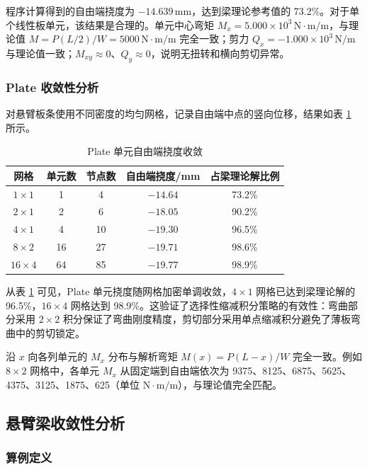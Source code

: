 \documentclass[UTF8,a4paper,zihao=-4]{ctexart}
\begin{document}
程序计算得到的自由端挠度为 $-14.639\,\mathrm{mm}$，达到梁理论参考值的 73.2\%。对于单个线性板单元，该结果是合理的。单元中心弯矩 $M_x=5.000\times10^3\,\mathrm{N\cdot m/m}$，与理论值 $M=P(L/2)/W=5000\,\mathrm{N\cdot m/m}$ 完全一致；剪力 $Q_x=-1.000\times10^3\,\mathrm{N/m}$ 与理论值一致；$M_{xy}\approx0$、$Q_y\approx0$，说明无扭转和横向剪切异常。

\subsubsection{Plate 收敛性分析}

对悬臂板条使用不同密度的均匀网格，记录自由端中点的竖向位移，结果如表 \ref{tab:plate_conv} 所示。

\begin{table}[H]
    \centering
    \caption{Plate 单元自由端挠度收敛}
    \label{tab:plate_conv}
    \begin{tabular}{ccccc}
        \toprule
        网格 & 单元数 & 节点数 & 自由端挠度/mm & 占梁理论解比例\\
        \midrule
        $1\times1$ & 1 & 4 & $-14.64$ & 73.2\%\\
        $2\times1$ & 2 & 6 & $-18.05$ & 90.2\%\\
        $4\times1$ & 4 & 10 & $-19.30$ & 96.5\%\\
        $8\times2$ & 16 & 27 & $-19.71$ & 98.6\%\\
        $16\times4$ & 64 & 85 & $-19.77$ & 98.9\%\\
        \bottomrule
    \end{tabular}
\end{table}

从表 \ref{tab:plate_conv} 可见，Plate 单元挠度随网格加密单调收敛，$4\times1$ 网格已达到梁理论解的 96.5\%，$16\times4$ 网格达到 98.9\%。这验证了选择性缩减积分策略的有效性：弯曲部分采用 $2\times2$ 积分保证了弯曲刚度精度，剪切部分采用单点缩减积分避免了薄板弯曲中的剪切锁定。

沿 $x$ 向各列单元的 $M_x$ 分布与解析弯矩 $M(x)=P(L-x)/W$ 完全一致。例如 $8\times2$ 网格中，各单元 $M_x$ 从固定端到自由端依次为 9375、8125、6875、5625、4375、3125、1875、625（单位 $\mathrm{N\cdot m/m}$），与理论值完全匹配。

\subsection{悬臂梁收敛性分析}

\subsubsection{算例定义}
\end{document}

